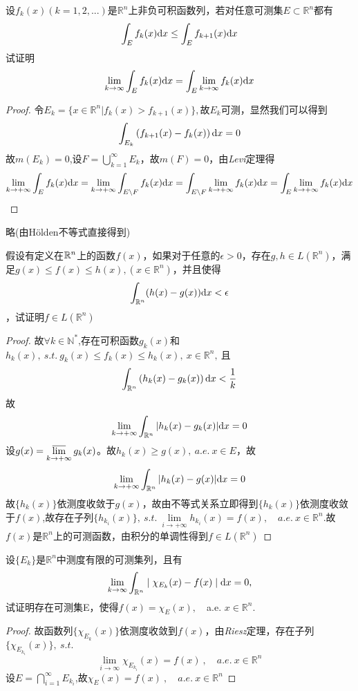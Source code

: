 设$f_k(x)(k=1,2,...)$是$\mathbb{R}^{n}$上非负可积函数列，若对任意可测集$E \subset \mathbb{R}^{n}$都有$$\int_E f_k(x) \mathrm{d}x \leq \int_E f_{k+1}(x) \mathrm{d}x$$试证明$$\lim\limits_{k \to \infty}\int_E f_k(x) \mathrm{d}x = \int_E \lim\limits_{k \to \infty}f_k(x) \mathrm{d}x$$
\begin{proof}
令$E_k=\{x\in \mathbb{R}^n|f_k(x)>f_{k+1}(x)\},$故$E_k$可测，显然我们可以得到$$\int_{E_k}\left(f_{k+1}(x)-f_k(x)\right)\mathrm{d}x=0$$故$m(E_k)=0$,设$F=\bigcup\limits_{k=1}^{\infty}E_k$，故$m(F)=0$，由\emph{Levi}定理得
$$\lim\limits_{k \to +\infty}\int_{E}f_k(x)\mathrm{d}x=\lim\limits_{k \to +\infty}\int_{E\setminus F}f_k(x)\mathrm{d}x=\int_{E\setminus F}\lim\limits_{k \to +\infty}f_k(x)\mathrm{d}x=\int_{E}\lim\limits_{k \to +\infty}f_k(x)\mathrm{d}x$$
\end{proof}


略(由H{\"o}lden不等式直接得到)


假设有定义在$\mathbb{R}^{n}$上的函数$f(x)$，如果对于任意的$\epsilon>0$，存在$g,h\in L(\mathbb{R}^n)$，满足$g(x) \leq f(x) \leq h(x),(x\in \mathbb{R}^n) $，并且使得$$\int_{\mathbb{R}^n}(h(x)-g(x)) \mathrm{d}x<\epsilon$$，试证明$f\in L(\mathbb{R}^n)$
\begin{proof}
故$\forall k\in \mathbb{N}^*$,存在可积函数$g_k(x)$和$h_k(x),\ s.t.\ g_k(x)\leq f_k(x)\leq h_k(x),\ x\in \mathbb{R}^n,\ $且$$\int_{\mathbb{R}^n}\left(h_k(x)-g_k(x)\right)\mathrm{d}x<\frac{1}{k}$$
故$$\lim\limits_{k \to +\infty}\int_{\mathbb{R}^n}|h_k(x)-g_k(x)|\mathrm{d}x=0$$设$g(x)=\varlimsup\limits_{k \to +\infty}g_k(x)$。故$h_k(x)\geq g(x),\ a.e.\ x \in E$，故$$\lim\limits_{k \to +\infty}\int_{\mathbb{R}^n}|h_k(x)-g(x)|\mathrm{d}x=0$$故$\{h_k(x)\}$依测度收敛于$g(x)$，故由不等式关系立即得到$\{h_k(x)\}$依测度收敛于$f(x)$,故存在子列$\{h_{k_i}(x)\},\ s.t.\ \lim\limits_{i \to +\infty}h_{k_i}(x)=f(x),\quad a.e.\  x\in \mathbb{R}^n$.故$f(x)$是$\mathbb{R}^n$上的可测函数，由积分的单调性得到$f\in L(\mathbb{R}^n)$
\end{proof}

设$\{E_k\}$是$\mathbb{R}^n$中测度有限的可测集列，且有$$\lim\limits_{k \to \infty}\int_{\mathbb{R}^n} \mid \chi_{E_k}(x)-f(x) \mid \mathrm{d}x=0,$$试证明存在可测集E，使得$f(x)=\chi_E(x),\quad$a.e. $x \in \mathbb{R}^n$.
\begin{proof}
故函数列$\{\chi_{E_k}(x)\}$依测度收敛到$f(x)$，由\emph{Riesz}定理，存在子列$\{\chi_{E_{k_i}}(x)\},\ s.t.$ $$\lim\limits_{i\to\infty}\chi_{E_{k_i}}(x)=f(x)\ ,\quad a.e.\ x\in\mathbb{R}^n$$设$E=\bigcap\limits_{i=1}^{\infty}E_{k_i}$,故$\chi_{E}(x)=f(x)\ ,\quad a.e. \ x\in \mathbb{R}^n$
\end{proof}



